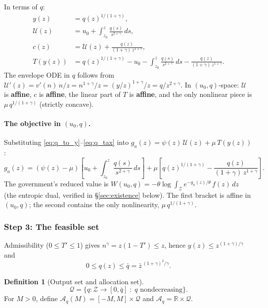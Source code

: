 \documentclass[12pt,a4paper]{article}
\theoremstyle{definition}
\newtheorem{definition}{Definition}[section]
\theoremstyle{plain}
\theoremstyle{remark}
\newcommand{\R}{\mathbb{R}}
\newcommand{\zbar}{\bar{z}}
\newcommand{\zlow}{z_{\scriptscriptstyle 0}}
\newcommand{\calU}{\mathcal{U}}
\newcommand{\calZ}{\mathcal{Z}}
\newcommand{\calA}{\mathcal{A}}
\begin{document}
In terms of $q$:
\begin{align}
  y(z) &= q(z)^{1/(1+\gamma)},
  \label{eq:q_to_y} \\[4pt]
  \calU(z) &= u_0 + \int_{\zlow}^z
  \frac{q(s)}{s^{2+\gamma}}\,ds,
  \label{eq:q_envelope} \\[4pt]
  c(z) &= \calU(z)
  + \frac{q(z)}{(1+\gamma)\,z^{1+\gamma}},
  \label{eq:q_consumption} \\[4pt]
  T(y(z)) &= q(z)^{1/(1+\gamma)}
  - u_0 - \int_{\zlow}^z \frac{q(s)}{s^{2+\gamma}}\,ds
  - \frac{q(z)}{(1+\gamma)\,z^{1+\gamma}}.
  \label{eq:q_tax}
\end{align}
The envelope ODE in $q$ follows from
$\calU'(z) = v'(n)\,n/z = n^{1+\gamma}/z
= (y/z)^{1+\gamma}/z = q/z^{2+\gamma}$.
In $(u_0, q)$-space: $\calU$ is \textbf{affine},
$c$ is \textbf{affine}, the linear part of $T$ is
\textbf{affine}, and the only nonlinear piece is
$\mu\,q^{1/(1+\gamma)}$ (strictly concave).

\paragraph{The objective in $(u_0, q)$.}
Substituting
\eqref{eq:q_to_y}--\eqref{eq:q_tax} into $g_a(z) =
\psi(z)\,\calU(z) + \mu\,T(y(z))$:
\begin{equation}
\label{eq:g_uq}
  g_a(z)
  = (\psi(z) - \mu)\!\left[u_0
    + \int_{\zlow}^z \frac{q(s)}{s^{2+\gamma}}\,ds\right]
  + \mu\!\left[q(z)^{1/(1+\gamma)}
    - \frac{q(z)}{(1{+}\gamma)\,z^{1+\gamma}}\right].
\end{equation}
The government's reduced value is
$W(u_0, q) = -\theta\log\!\int_\calZ
e^{-g_a(z)/\theta}\,f(z)\,dz$
(the entropic dual, verified in \S\ref{sec:existence}
below).  The first bracket is affine in $(u_0, q)$; the
second contains the only nonlinearity,
$\mu\,q^{1/(1+\gamma)}$.


\subsubsection{Step 3: The feasible set}

Admissibility ($0 \leq T' \leq 1$) gives
$n^\gamma = z(1-T') \leq z$, hence
$y(z) \leq z^{(1+\gamma)/\gamma}$ and
\begin{equation}
\label{eq:q_bound}
  0 \leq q(z) \leq \bar q
  = \zbar^{\,(1+\gamma)^2/\gamma}.
\end{equation}

\begin{definition}[Output set and allocation set]
\label{def:A_q}
\[
  \mathcal{Q} = \bigl\{q: \calZ \to [0, \bar q]
  \;:\; q \text{ nondecreasing}\bigr\}.
\]
For $M > 0$, define
$\calA_q(M) = [-M, M] \times \mathcal{Q}$ and
$\calA_q = \R \times \mathcal{Q}$.
\end{definition}
\end{document}
